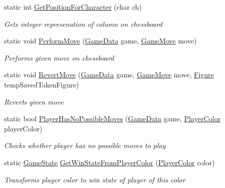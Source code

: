 \begin{DoxyCompactItemize}
static int \mbox{\hyperlink{class_chess_tracking_1_1_game_1_1_game_validator_a231e517419b3738888d68a870da7445d}{Get\+Position\+For\+Character}} (char ch)
\begin{DoxyCompactList}\small\item\em Gets integer represenation of column on chessboard \end{DoxyCompactList}\item 
static void \mbox{\hyperlink{class_chess_tracking_1_1_game_1_1_game_validator_aed12c92e698d54c439a7ab0293a26b48}{Perform\+Move}} (\mbox{\hyperlink{class_chess_tracking_1_1_game_1_1_game_data}{Game\+Data}} game, \mbox{\hyperlink{class_chess_tracking_1_1_game_1_1_game_move}{Game\+Move}} move)
\begin{DoxyCompactList}\small\item\em Performs given move on chessboard \end{DoxyCompactList}\item 
static void \mbox{\hyperlink{class_chess_tracking_1_1_game_1_1_game_validator_a4c30ee1e2e8ae6afb00f75425b449854}{Revert\+Move}} (\mbox{\hyperlink{class_chess_tracking_1_1_game_1_1_game_data}{Game\+Data}} game, \mbox{\hyperlink{class_chess_tracking_1_1_game_1_1_game_move}{Game\+Move}} move, \mbox{\hyperlink{class_chess_tracking_1_1_game_1_1_figure}{Figure}} temp\+Saved\+Taken\+Figure)
\begin{DoxyCompactList}\small\item\em Reverts given move \end{DoxyCompactList}\item 
static bool \mbox{\hyperlink{class_chess_tracking_1_1_game_1_1_game_validator_a9b6bedb9fa2b0a96790228c6f364e249}{Player\+Has\+No\+Possible\+Moves}} (\mbox{\hyperlink{class_chess_tracking_1_1_game_1_1_game_data}{Game\+Data}} game, \mbox{\hyperlink{namespace_chess_tracking_1_1_game_ab79070a55977a8c8326e9cdda7dcfa9a}{Player\+Color}} player\+Color)
\begin{DoxyCompactList}\small\item\em Checks whether player has no possible moves to play \end{DoxyCompactList}\item 
static \mbox{\hyperlink{namespace_chess_tracking_1_1_game_acd441ca4d0791bf4bf7fa8ec204a1ed7}{Game\+State}} \mbox{\hyperlink{class_chess_tracking_1_1_game_1_1_game_validator_a875c72479331c044b547f2a257338ce0}{Get\+Win\+State\+From\+Player\+Color}} (\mbox{\hyperlink{namespace_chess_tracking_1_1_game_ab79070a55977a8c8326e9cdda7dcfa9a}{Player\+Color}} color)
\begin{DoxyCompactList}\small\item\em Transforms player color to win state of player of this color \end{DoxyCompactList}\item 

\end{DoxyCompactItemize}
